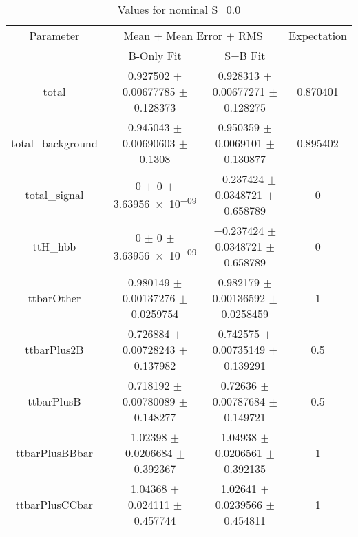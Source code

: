 \begin{table}
\centering
\caption{Values for nominal S=0.0}
\begin{tabular}{cccc}
\toprule
Parameter & \multicolumn{2}{c}{Mean $\pm$ Mean Error $\pm$ RMS} & Expectation\\
 & B-Only Fit & S+B Fit & \\
\midrule
total & \num{0.927502} $\pm$ \num{0.00677785} $\pm$ \num{0.128373} & \num{0.928313} $\pm$ \num{0.00677271} $\pm$ \num{0.128275} & \num{0.870401}\\
total\_background & \num{0.945043} $\pm$ \num{0.00690603} $\pm$ \num{0.1308} & \num{0.950359} $\pm$ \num{0.0069101} $\pm$ \num{0.130877} & \num{0.895402}\\
total\_signal & \num{0} $\pm$ \num{0} $\pm$ \num{3.63956e-09} & \num{-0.237424} $\pm$ \num{0.0348721} $\pm$ \num{0.658789} & \num{0}\\
ttH\_hbb & \num{0} $\pm$ \num{0} $\pm$ \num{3.63956e-09} & \num{-0.237424} $\pm$ \num{0.0348721} $\pm$ \num{0.658789} & \num{0}\\
ttbarOther & \num{0.980149} $\pm$ \num{0.00137276} $\pm$ \num{0.0259754} & \num{0.982179} $\pm$ \num{0.00136592} $\pm$ \num{0.0258459} & \num{1}\\
ttbarPlus2B & \num{0.726884} $\pm$ \num{0.00728243} $\pm$ \num{0.137982} & \num{0.742575} $\pm$ \num{0.00735149} $\pm$ \num{0.139291} & \num{0.5}\\
ttbarPlusB & \num{0.718192} $\pm$ \num{0.00780089} $\pm$ \num{0.148277} & \num{0.72636} $\pm$ \num{0.00787684} $\pm$ \num{0.149721} & \num{0.5}\\
ttbarPlusBBbar & \num{1.02398} $\pm$ \num{0.0206684} $\pm$ \num{0.392367} & \num{1.04938} $\pm$ \num{0.0206561} $\pm$ \num{0.392135} & \num{1}\\
ttbarPlusCCbar & \num{1.04368} $\pm$ \num{0.024111} $\pm$ \num{0.457744} & \num{1.02641} $\pm$ \num{0.0239566} $\pm$ \num{0.454811} & \num{1}\\
\bottomrule
\end{tabular}
\end{table}